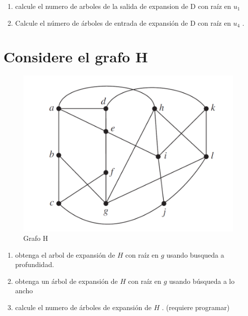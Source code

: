 \documentclass[10pt,a4paper]{article} %
\begin{document}
        \begin{enumerate}
            \item {calcule el numero de arboles de la salida de expansion de D con raíz en $u_1$ }
            \item {Calcule el número de árboles de entrada de expansión de D con raíz en $u_4$ .}
        \end{enumerate}






    \newpage
    \section{Considere el grafo H}

        \begin{figure}[h!]
            \centering
            \includegraphics[width=0.5\linewidth]{grafoH.png}
            \caption{Grafo H}
            \label{grafoh}
        \end{figure}

        \begin{enumerate}
            \item {obtenga el arbol de expansión de $H$ con raíz en $g$ usando
                busqueda a profundidad.}
            \item {obtenga un árbol de expansión de $H$ con raíz en $g$ usando
                búsqueda a lo ancho}
            \item {calcule el numero de árboles de expansión de $H$ . (requiere
                programar)}
        \end{enumerate}




    \newpage
\end{document}
